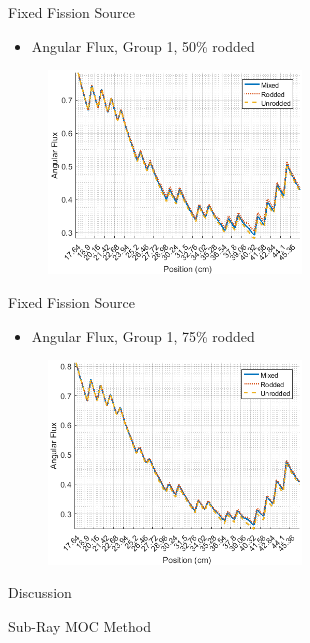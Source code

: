 
\begin{frame}[t]{Fixed Fission Source}

\begin{itemize}
  \item Angular Flux, Group 1, 50\% rodded
\end{itemize}
\begin{figure}[H]
  \centering
  \includegraphics[width=0.6\textwidth]{../figs/1dmoc-50mix-angflux1.png}
\end{figure}

\end{frame}


\begin{frame}[t]{Fixed Fission Source}

\begin{itemize}
  \item Angular Flux, Group 1, 75\% rodded
\end{itemize}
\begin{figure}[H]
  \centering
  \includegraphics[width=0.6\textwidth]{../figs/1dmoc-75mix-angflux1.png}
\end{figure}

\end{frame}


\begin{frame}[t]{Discussion}
    
    
    
\end{frame}


\begin{frame}[t]{Sub-Ray MOC Method}
    
    
    
\end{frame}